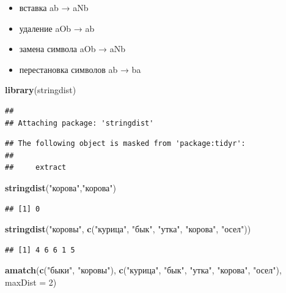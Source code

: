 \documentclass[
]{book}
\newenvironment{Shaded}{\begin{snugshade}}{\end{snugshade}}
\newcommand{\DataTypeTok}[1]{\textcolor[rgb]{0.13,0.29,0.53}{#1}}
\newcommand{\DecValTok}[1]{\textcolor[rgb]{0.00,0.00,0.81}{#1}}
\newcommand{\KeywordTok}[1]{\textcolor[rgb]{0.13,0.29,0.53}{\textbf{#1}}}
\newcommand{\NormalTok}[1]{#1}
\newcommand{\StringTok}[1]{\textcolor[rgb]{0.31,0.60,0.02}{#1}}
\providecommand{\tightlist}{%
  \setlength{\itemsep}{0pt}\setlength{\parskip}{0pt}}
\begin{document}
\begin{itemize}
\tightlist
\item
  вставка ab → aNb
\item
  удаление aOb → ab
\item
  замена символа aOb → aNb
\item
  перестановка символов ab → ba
\end{itemize}

\begin{Shaded}
\begin{Highlighting}[]
\KeywordTok{library}\NormalTok{(stringdist)}
\end{Highlighting}
\end{Shaded}

\begin{verbatim}
## 
## Attaching package: 'stringdist'
\end{verbatim}

\begin{verbatim}
## The following object is masked from 'package:tidyr':
## 
##     extract
\end{verbatim}

\begin{Shaded}
\begin{Highlighting}[]
\KeywordTok{stringdist}\NormalTok{(}\StringTok{"корова"}\NormalTok{,}\StringTok{"корова"}\NormalTok{)}
\end{Highlighting}
\end{Shaded}

\begin{verbatim}
## [1] 0
\end{verbatim}

\begin{Shaded}
\begin{Highlighting}[]
\KeywordTok{stringdist}\NormalTok{(}\StringTok{"коровы"}\NormalTok{, }\KeywordTok{c}\NormalTok{(}\StringTok{"курица"}\NormalTok{, }\StringTok{"бык"}\NormalTok{, }\StringTok{"утка"}\NormalTok{, }\StringTok{"корова"}\NormalTok{, }\StringTok{"осел"}\NormalTok{))}
\end{Highlighting}
\end{Shaded}

\begin{verbatim}
## [1] 4 6 6 1 5
\end{verbatim}

\begin{Shaded}
\begin{Highlighting}[]
\KeywordTok{amatch}\NormalTok{(}\KeywordTok{c}\NormalTok{(}\StringTok{"быки"}\NormalTok{, }\StringTok{"коровы"}\NormalTok{), }\KeywordTok{c}\NormalTok{(}\StringTok{"курица"}\NormalTok{, }\StringTok{"бык"}\NormalTok{, }\StringTok{"утка"}\NormalTok{, }\StringTok{"корова"}\NormalTok{, }\StringTok{"осел"}\NormalTok{), }\DataTypeTok{maxDist =} \DecValTok{2}\NormalTok{)}
\end{Highlighting}
\end{Shaded}
\end{document}
